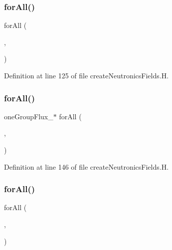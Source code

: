 \subsubsection{\texorpdfstring{for\+All()}{forAll()}\hspace{0.1cm}{\footnotesize\ttfamily [2/5]}}
{\footnotesize\ttfamily for\+All (\begin{DoxyParamCaption}\item[{flux\+Star\+\_\+}]{,  }\item[{fluxI}]{ }\end{DoxyParamCaption})}



Definition at line 125 of file create\+Neutronics\+Fields.\+H.

\mbox{\label{createNeutronicsFields_8H_ac61a9f70f5e91480e954d78dd7c78d2b}} 
\subsubsection{\texorpdfstring{for\+All()}{forAll()}\hspace{0.1cm}{\footnotesize\ttfamily [3/5]}}
{\footnotesize\ttfamily one\+Group\+Flux\+\_\+$\ast$ for\+All (\begin{DoxyParamCaption}\item[{flux\+\_\+}]{,  }\item[{energyI}]{ }\end{DoxyParamCaption})}



Definition at line 146 of file create\+Neutronics\+Fields.\+H.

\mbox{\label{createNeutronicsFields_8H_ad3d45c8213dc434fb2bedf6c4ff497e9}} 
\subsubsection{\texorpdfstring{for\+All()}{forAll()}\hspace{0.1cm}{\footnotesize\ttfamily [4/5]}}
{\footnotesize\ttfamily for\+All (\begin{DoxyParamCaption}\item[{prec\+Star\+\_\+}]{,  }\item[{precI}]{ }\end{DoxyParamCaption})}



